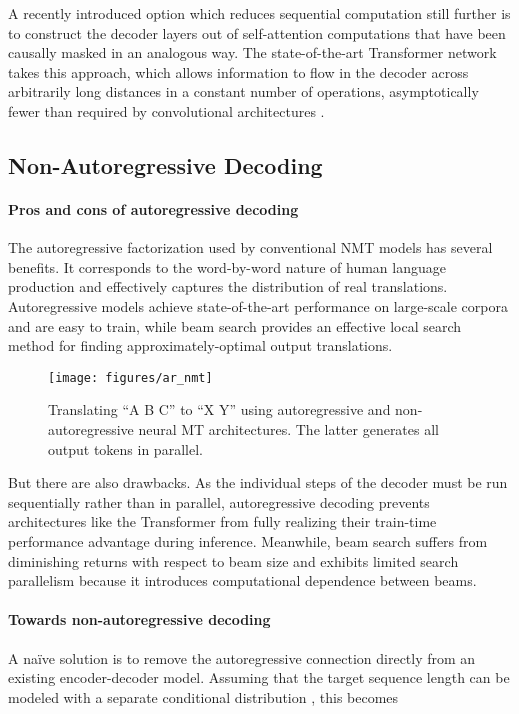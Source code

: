 \documentclass{article} \usepackage{iclr2018_conference,times}
\begin{document}
A recently introduced option which reduces sequential computation still further is to construct the decoder layers out of self-attention computations that have been causally masked in an analogous way.
The state-of-the-art Transformer network takes this approach, which allows information to flow in the decoder across arbitrarily long distances in a constant number of operations, asymptotically fewer than required by convolutional architectures \citep{vaswani2017attention}.

\subsection{Non-Autoregressive Decoding}
\vspace{-5pt}
\paragraph{Pros and cons of autoregressive decoding}
The autoregressive factorization used by conventional NMT models has several benefits. It corresponds to the word-by-word nature of human language production and effectively captures the distribution of real translations. Autoregressive models achieve state-of-the-art performance on large-scale corpora and are easy to train, while beam search provides an effective local search method for finding approximately-optimal output translations.

\begin{wrapfigure}{r}{0.35\textwidth} 
\vspace{-10pt}
\centering
\texttt{[image: figures/ar\_nmt]}
\caption{\label{fig.ar_vs_nar} Translating ``A B C'' to ``X Y'' using autoregressive and non-autoregressive neural MT architectures. The latter generates all output tokens in parallel.}\vspace{-20pt}
\end{wrapfigure}

But there are also drawbacks. As the individual steps of the decoder must be run sequentially rather than in parallel, autoregressive decoding prevents architectures like the Transformer from fully realizing their train-time performance advantage during inference. Meanwhile, beam search suffers from diminishing returns with respect to beam size \citep{koehn2017six} and exhibits limited search parallelism because it introduces computational dependence between beams.

\vspace{-5pt}
\paragraph{Towards non-autoregressive decoding}
A na\"{i}ve solution is to remove the autoregressive connection directly from an existing encoder-decoder model. Assuming that the target sequence length  can be modeled with a separate conditional distribution , this becomes
\end{document}
